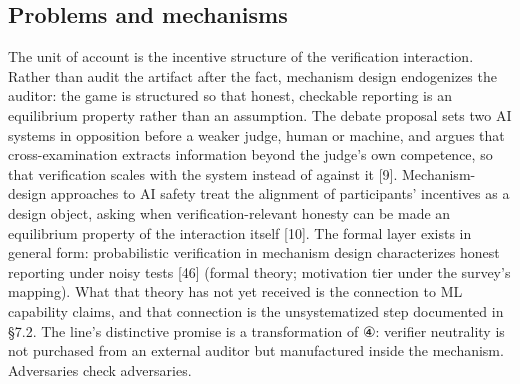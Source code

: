 \documentclass[11pt]{article}
\begin{document}
\subsection{Problems and mechanisms}
\noindent The unit of account is the incentive structure of the verification interaction. Rather than audit the artifact after the fact, mechanism design endogenizes the auditor: the game is structured so that honest, checkable reporting is an equilibrium property rather than an assumption. The debate proposal sets two AI systems in opposition before a weaker judge, human or machine, and argues that cross-examination extracts information beyond the judge's own competence, so that verification scales with the system instead of against it [9]. Mechanism-design approaches to AI safety treat the alignment of participants' incentives as a design object, asking when verification-relevant honesty can be made an equilibrium property of the interaction itself [10]. The formal layer exists in general form: probabilistic verification in mechanism design characterizes honest reporting under noisy tests [46] (formal theory; motivation tier under the survey's mapping). What that theory has not yet received is the connection to ML capability claims, and that connection is the unsystematized step documented in §7.2. The line's distinctive promise is a transformation of ④: verifier neutrality is not purchased from an external auditor but manufactured inside the mechanism. Adversaries check adversaries.\par
\end{document}
